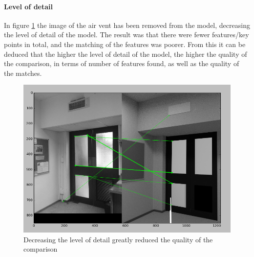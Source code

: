 \documentclass[11pt,a4paper]{report}
\begin{document}
				\paragraph{Level of detail}
					In figure \ref{fig:level_of_detail_results} the image of the air vent has been removed from the model, decreasing the level of detail of the model. The result was that there were fewer features/key points in total, and the matching of the features was poorer. From this it can be deduced that the higher the level of detail of the model, the higher the quality of the comparison, in terms of number of features found, as well as the quality of the matches.
					\begin{figure}[H]
						\centering
						\includegraphics[width=1\textwidth]{level_of_detail_results}
						\caption[Level of detail results]{Decreasing the level of detail greatly reduced the quality of the comparison}
						\label{fig:level_of_detail_results}
					\end{figure}
\end{document}
